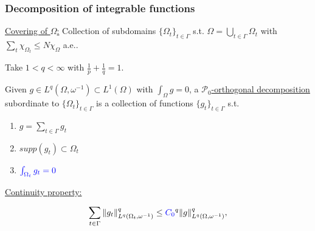 \documentclass[small,xcolor=svgnames]{beamer}
\def\o{\omega}
\def\O{\Omega}
\def\P{\mathcal{P}}
\def\c{\color{blue}}
\begin{document}
\begin{frame}\frametitle{Decomposition of integrable functions}

{\c\underline{Covering of $\O$:}} Collection of subdomains $\{\O_t\}_{t\in\Gamma}$ s.t. $\Omega=\bigcup_{t\in \Gamma}\Omega_t$ with  {\c$\sum_{t}\chi_{\Omega_t}\leq N\chi_{\Omega}$} a.e..

\bigskip

Take $1<q<\infty$ with {\c $\frac{1}{p}+\frac{1}{q}=1$}. 

\bigskip

Given $g\in L^q(\O,\o^{-1})\subset L^1(\O)$ with {\c $\int_\Omega g=0$}, a {\c\underline{$\P_0$-orthogonal decomposition}} subordinate to $\{\O_t\}_{t\in\Gamma}$ is a collection of functions $\{g_t\}_{t\in\Gamma}$ s.t.

\begin{enumerate}
\item $g=\sum_{t\in\Gamma}g_t$
\item $supp(g_t)\subset \O_t$
\item ${\c \int_{\Omega_t}g_t=0}$
\end{enumerate}

 \smallskip

{\c\underline{Continuity property:}}

\begin{eqnarray*}
\sum_{t\in \Gamma} \|g_t\|^q_{L^q(\O_t,\o^{-1})}\leq {\c C_0}^q\|g\|^q_{L^q(\O,\o^{-1})},
\end{eqnarray*}

\end{frame}

\end{document}
